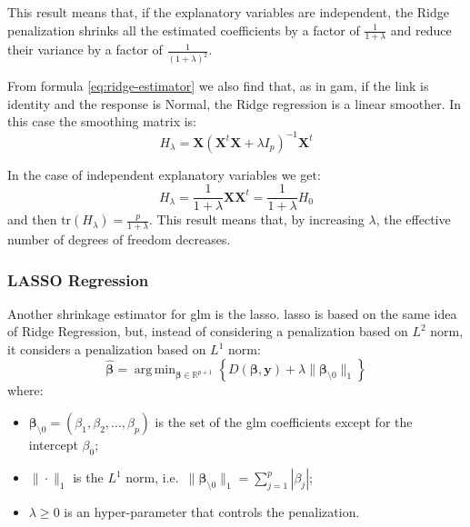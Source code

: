 \documentclass[a4paper, twoside, openright, 12pt]{report}
\providecommand{\tightlist}{%
  \setlength{\itemsep}{0pt}\setlength{\parskip}{0pt}}
\DeclareMathOperator*{\argmin}{arg\,min}  %
\theoremstyle{definition}
\theoremstyle{definition}
\theoremstyle{definition}
\theoremstyle{remark}
\begin{document}
This result means that, if the explanatory variables are independent, the Ridge penalization shrinks all the estimated coefficients by a factor of \(\frac{1}{1+\lambda}\) and reduce their variance by a factor of \(\frac{1}{\left(1+\lambda\right)^2}\).

From formula \eqref{eq:ridge-estimator} we also find that, as in \ac{gam}, if the link is identity and the response is Normal, the Ridge regression is a linear smoother. In this case the smoothing matrix is:
\[
H_{\lambda} = \boldsymbol{X} \left(\boldsymbol{X}^t\boldsymbol{X}+\lambda I_p\right)^{-1}\boldsymbol{X}^t
\]

In the case of independent explanatory variables we get:
\[
H_{\lambda} = \frac{1}{1+\lambda} \boldsymbol{X} \boldsymbol{X}^t = \frac{1}{1+\lambda} H_0
\]
and then \(\text{tr}\left(H_{\lambda}\right) = \frac{p}{1+\lambda}\). This result means that, by increasing \(\lambda\), the effective number of degrees of freedom decreases.

\hypertarget{lasso-regression}{%
\subsubsection{LASSO Regression}\label{lasso-regression}}

Another shrinkage estimator for \ac{glm} is the \ac{lasso}. \ac{lasso} is based on the same idea of Ridge Regression, but, instead of considering a penalization based on \(L^2\) norm, it considers a penalization based on \(L^1\) norm:
\begin{equation}
\label{eq:lasso-est-deviance}
\hat{\boldsymbol{\beta}} = \argmin_{\boldsymbol{\beta}\in\mathbb{R}^{p+1}}{\left\{D(\boldsymbol{\beta}, \boldsymbol{y}) + \lambda \|\boldsymbol{\beta}_{\setminus0}\|_1\right\}}
\end{equation}
where:

\begin{itemize}
\tightlist
\item
  \(\boldsymbol{\beta}_{\setminus0} = \left(\beta_1, \beta_2, \dots, \beta_p\right)\) is the set of the \ac{glm} coefficients except for the intercept \(\beta_0\);
\item
  \(\|\cdot\|_1\) is the \(L^1\) norm, i.e.~\(\|\boldsymbol{\beta}_{\setminus0}\|_1 = \sum_{j=1}^p{|\beta_j|}\);
\item
  \(\lambda\ge0\) is an hyper-parameter that controls the penalization.
\end{itemize}
\end{document}
